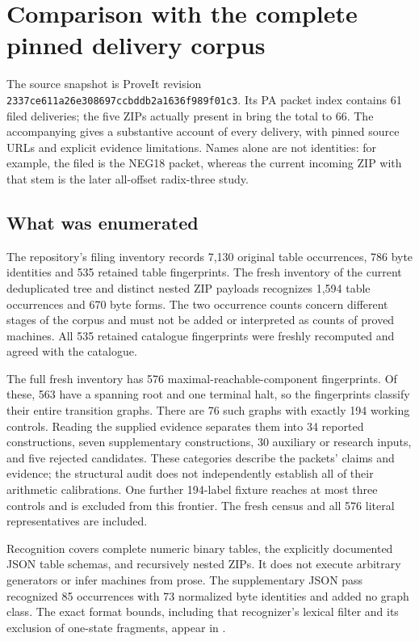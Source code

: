 \section{Comparison with the complete pinned delivery corpus}

The source snapshot is ProveIt revision
\texttt{2337ce611a26e308697ccbddb2a1636f989f01c3}.
Its PA packet index contains 61 filed deliveries; the five ZIPs actually present
in  bring the total to 66. The accompanying
 gives a substantive account of every delivery,
with pinned source URLs and explicit evidence limitations. Names alone are
not identities: for example, the filed
 is the NEG18 packet, whereas the
current incoming ZIP with that stem is the later all-offset radix-three study.

\subsection{What was enumerated}

The repository's filing inventory records 7,130 original table occurrences,
786 byte identities and 535 retained table fingerprints. The fresh inventory
of the current deduplicated tree and distinct nested ZIP payloads recognizes
1,594 table occurrences and 670 byte forms. The two occurrence counts concern
different stages of the corpus and must not be added or interpreted as counts
of proved machines. All 535 retained catalogue fingerprints were freshly
recomputed and agreed with the catalogue.

The full fresh inventory has 576 maximal-reachable-component fingerprints.
Of these, 563 have a spanning root and one terminal halt, so the fingerprints
classify their entire transition graphs. There are 76 such graphs with
exactly 194 working controls. Reading the supplied evidence separates them
into 34 reported constructions, seven supplementary constructions, 30
auxiliary or research inputs, and five rejected candidates. These categories
describe the packets' claims and evidence; the structural audit does not
independently establish all of their arithmetic calibrations. One further
194-label fixture reaches at most three controls and is excluded from this
frontier. The fresh census and all 576 literal representatives are included.

Recognition covers complete numeric binary tables, the explicitly documented
JSON table schemas, and recursively nested ZIPs. It does not execute arbitrary
generators or infer machines from prose. The supplementary JSON pass recognized
85 occurrences with 73 normalized byte identities and added no graph class.
The exact format bounds, including that recognizer's lexical filter and its
exclusion of one-state fragments, appear in .

